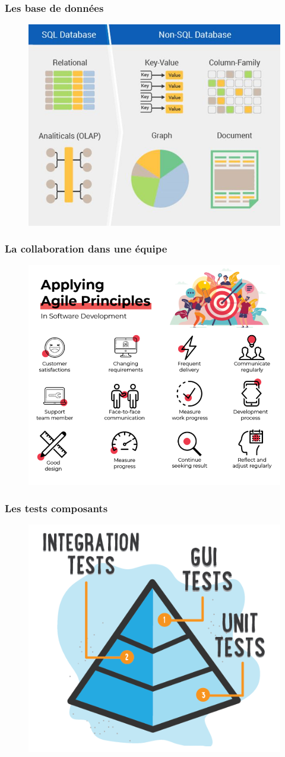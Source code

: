 \begin{frame}
    \frametitle{Les base de données}

    \begin{figure}
        \centering
        \includegraphics[height=0.5\linewidth]{figures/introduction/database}
        \label{fig:database}
    \end{figure}
\end{frame}

\begin{frame}
    \frametitle{La collaboration dans une équipe}

    \begin{figure}
        \centering
        \includegraphics[height=0.5\linewidth]{figures/introduction/agile}
        \label{fig:collaboration}
    \end{figure}
\end{frame}

\begin{frame}
    \frametitle{Les tests composants}

    \begin{figure}
        \centering
        \includegraphics[height=0.5\linewidth]{figures/introduction/tests}
        \label{fig:tests}
    \end{figure}
\end{frame}

